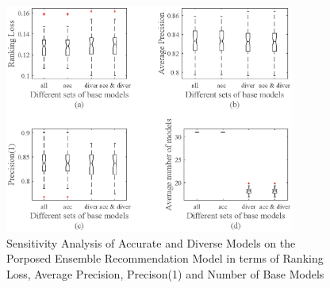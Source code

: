 \documentclass[prodmode,acmtkdd]{acmsmall}
\begin{document}
\begin{figure}[!h]
	\centering
	\includegraphics[width=0.85\textwidth]{Figures/SensitiveAnalysis1}
	\caption{Sensitivity Analysis of Accurate and Diverse Models on the Porposed Ensemble Recommendation Model in terms of Ranking Loss, Average Precision, Precison(1) and Number of Base Models}\label{Fig:sensitiveAnalysis}
\end{figure}
\end{document}
